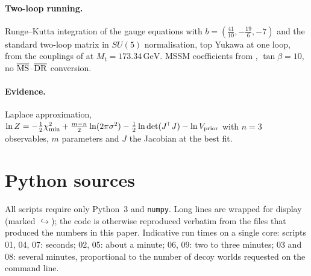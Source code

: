 \documentclass[11pt,a4paper]{article}
\newcommand{\GeV}{\,\mathrm{GeV}}
\begin{document}
\paragraph{Two-loop running.} Runge--Kutta integration of the gauge equations with
$b=(\tfrac{41}{10},-\tfrac{19}6,-7)$ and the standard two-loop matrix in $SU(5)$ normalisation, top Yukawa at one loop, from the
couplings of \cite{Buttazzo} at $M_t=173.34\GeV$. MSSM coefficients from \cite{BJLL2}, $\tan\beta=10$, no $\overline{\rm MS}$--$\overline{\rm DR}$ conversion.

\paragraph{Evidence.} Laplace approximation,
$\ln Z=-\tfrac12\chi^2_{\min}+\tfrac{m-n}2\ln(2\pi\sigma^2)-\tfrac12\ln\det(J^{\!\top}J)-\ln V_{\rm prior}$ with $n=3$ observables, $m$ parameters
and $J$ the Jacobian at the best fit.

\section{Python sources}
All scripts require only Python~3 and \texttt{numpy}. Long lines are wrapped for display (marked $\hookrightarrow$); the code is
otherwise reproduced verbatim from the files that produced the numbers in this paper. Indicative run times on a single core:
scripts 01, 04, 07: seconds; 02, 05: about a minute; 06, 09: two to three minutes; 03 and 08: several minutes, proportional to the
number of decoy worlds requested on the command line.
\end{document}
